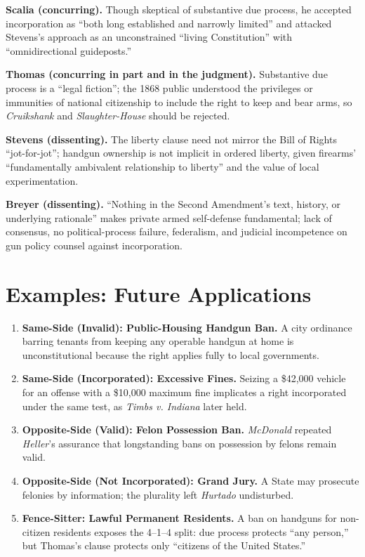 \documentclass[12pt]{article}
\begin{document}
\textbf{Scalia (concurring).} Though skeptical of substantive due process, he accepted incorporation as ``both long established and narrowly limited'' and attacked Stevens's approach as an unconstrained ``living Constitution'' with ``omnidirectional guideposts.''

\textbf{Thomas (concurring in part and in the judgment).} Substantive due process is a ``legal fiction''; the 1868 public understood the privileges or immunities of national citizenship to include the right to keep and bear arms, so \textit{Cruikshank} and \textit{Slaughter-House} should be rejected.

\textbf{Stevens (dissenting).} The liberty clause need not mirror the Bill of Rights ``jot-for-jot''; handgun ownership is not implicit in ordered liberty, given firearms' ``fundamentally ambivalent relationship to liberty'' and the value of local experimentation.

\textbf{Breyer (dissenting).} ``Nothing in the Second Amendment's text, history, or underlying rationale'' makes private armed self-defense fundamental; lack of consensus, no political-process failure, federalism, and judicial incompetence on gun policy counsel against incorporation.

\section{Examples: Future Applications}

\begin{enumerate}
\item \textbf{Same-Side (Invalid): Public-Housing Handgun Ban.} A city ordinance barring tenants from keeping any operable handgun at home is unconstitutional because the right applies fully to local governments.
\item \textbf{Same-Side (Incorporated): Excessive Fines.} Seizing a \$42,000 vehicle for an offense with a \$10,000 maximum fine implicates a right incorporated under the same test, as \textit{Timbs v. Indiana} later held.
\item \textbf{Opposite-Side (Valid): Felon Possession Ban.} \textit{McDonald} repeated \textit{Heller}'s assurance that longstanding bans on possession by felons remain valid.
\item \textbf{Opposite-Side (Not Incorporated): Grand Jury.} A State may prosecute felonies by information; the plurality left \textit{Hurtado} undisturbed.
\item \textbf{Fence-Sitter: Lawful Permanent Residents.} A ban on handguns for non-citizen residents exposes the 4--1--4 split: due process protects ``any person,'' but Thomas's clause protects only ``citizens of the United States.''
\end{enumerate}
\end{document}

